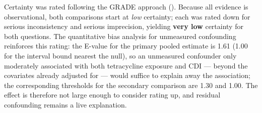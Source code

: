 \documentclass[
  letterpaper,
  DIV=11,
  numbers=noendperiod]{scrartcl}
\begin{document}
Certainty was rated following the GRADE approach
(). Because all
evidence is observational, both comparisons start at \emph{low}
certainty; each was rated down for serious inconsistency and serious
imprecision, yielding \textbf{very low} certainty for both questions.
The quantitative bias analysis for unmeasured confounding reinforces
this rating: the E-value for the primary pooled estimate is 1.61 (1.00
for the interval bound nearest the null), so an unmeasured confounder
only moderately associated with both tetracycline exposure and CDI ---
beyond the covariates already adjusted for --- would suffice to explain
away the association; the corresponding thresholds for the secondary
comparison are 1.30 and 1.00. The effect is therefore not large enough
to consider rating up, and residual confounding remains a live
explanation.
\end{document}
